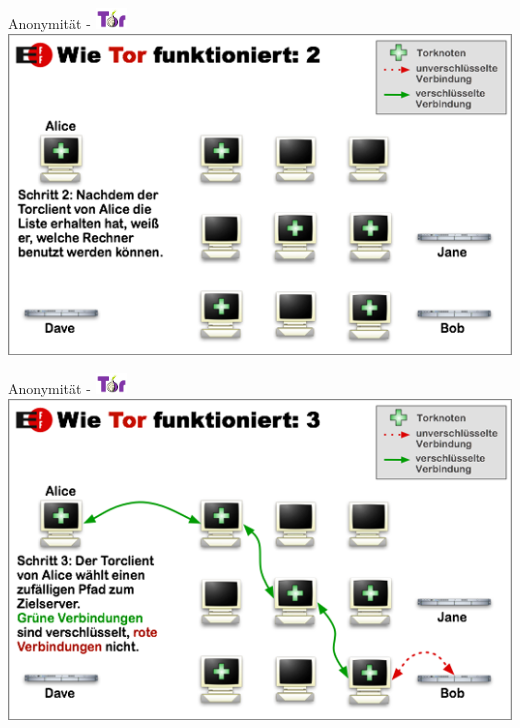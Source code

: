 \documentclass{beamer}
\begin{document}
\begin{frame}{Anonymität - \includegraphics[align=c,height=1.5em]{tor.jpg}}
    \centering\includegraphics[height=0.7\textheight]{tor2.png}
\end{frame}

\begin{frame}{Anonymität - \includegraphics[align=c,height=1.5em]{tor.jpg}}
    \centering\includegraphics[height=0.7\textheight]{tor3.png}
\end{frame}
\end{document}
